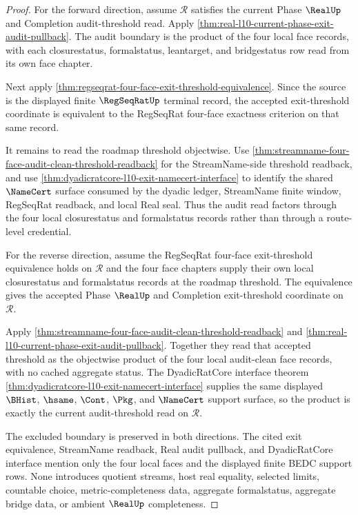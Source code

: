 \begin{proof}
For the forward direction, assume $\mathcal R$ satisfies the current Phase $\RealUp$ and Completion audit-threshold read. Apply \autoref{thm:real-l10-current-phase-exit-audit-pullback}. The audit boundary is the product of the four local face records, with each closurestatus, formalstatus, leantarget, and bridgestatus row read from its own face chapter.

Next apply \autoref{thm:regseqrat-four-face-exit-threshold-equivalence}. Since the source is the displayed finite $\RegSeqRatUp$ terminal record, the accepted exit-threshold coordinate is equivalent to the RegSeqRat four-face exactness criterion on that same record.

It remains to read the roadmap threshold objectwise. Use \autoref{thm:streamname-four-face-audit-clean-threshold-readback} for the StreamName-side threshold readback, and use \autoref{thm:dyadicratcore-l10-exit-namecert-interface} to identify the shared $\NameCert$ surface consumed by the dyadic ledger, StreamName finite window, RegSeqRat readback, and local Real seal. Thus the audit read factors through the four local closurestatus and formalstatus records rather than through a route-level credential.

For the reverse direction, assume the RegSeqRat four-face exit-threshold equivalence holds on $\mathcal R$ and the four face chapters supply their own local closurestatus and formalstatus records at the roadmap threshold. The equivalence gives the accepted Phase $\RealUp$ and Completion exit-threshold coordinate on $\mathcal R$.

Apply \autoref{thm:streamname-four-face-audit-clean-threshold-readback} and \autoref{thm:real-l10-current-phase-exit-audit-pullback}. Together they read that accepted threshold as the objectwise product of the four local audit-clean face records, with no cached aggregate status. The DyadicRatCore interface theorem \autoref{thm:dyadicratcore-l10-exit-namecert-interface} supplies the same displayed $\BHist$, $\hsame$, $\Cont$, $\Pkg$, and $\NameCert$ support surface, so the product is exactly the current audit-threshold read on $\mathcal R$.

The excluded boundary is preserved in both directions. The cited exit equivalence, StreamName readback, Real audit pullback, and DyadicRatCore interface mention only the four local faces and the displayed finite BEDC support rows. None introduces quotient streams, host real equality, selected limits, countable choice, metric-completeness data, aggregate formalstatus, aggregate bridge data, or ambient $\RealUp$ completeness.
\end{proof}

